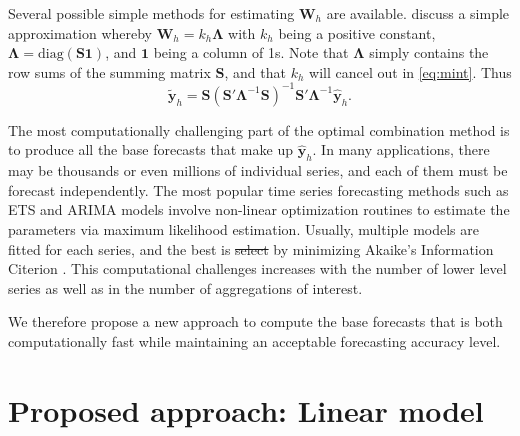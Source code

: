 \documentclass[11pt,a4paper,]{article}
\providecommand{\DIFaddtex}[1]{{\protect\color{blue}\uwave{#1}}} %
\providecommand{\DIFdeltex}[1]{{\protect\color{red}\sout{#1}}}                      %
\providecommand{\DIFaddbegin}{} %
\providecommand{\DIFaddend}{} %
\providecommand{\DIFdelbegin}{} %
\providecommand{\DIFdelend}{} %
\providecommand{\DIFadd}[1]{\texorpdfstring{\DIFaddtex{#1}}{#1}} %
\providecommand{\DIFdel}[1]{\texorpdfstring{\DIFdeltex{#1}}{}} %
\newcommand{\DIFscaledelfig}{0.5}
\newlength{\DIFdelgraphicswidth} %
\newlength{\DIFdelgraphicsheight} %
\newcommand{\DIFaddincludegraphics}[2][]{{\color{blue}\fbox{\DIFOincludegraphics[#1]{#2}}}} %
\newcommand{\DIFdelincludegraphics}[2][]{%
\sbox{\DIFdelgraphicsbox}{\DIFOincludegraphics[#1]{#2}}%
\settoboxwidth{\DIFdelgraphicswidth}{\DIFdelgraphicsbox} %
\settoboxtotalheight{\DIFdelgraphicsheight}{\DIFdelgraphicsbox} %
\scalebox{\DIFscaledelfig}{%
\parbox[b]{\DIFdelgraphicswidth}{\usebox{\DIFdelgraphicsbox}\\[-\baselineskip] \rule{\DIFdelgraphicswidth}{0em}}\llap{\resizebox{\DIFdelgraphicswidth}{\DIFdelgraphicsheight}{%
\setlength{\unitlength}{\DIFdelgraphicswidth}%
\begin{picture}(1,1)%
\thicklines\linethickness{2pt} %
{\color[rgb]{1,0,0}\put(0,0){\framebox(1,1){}}}%
{\color[rgb]{1,0,0}\put(0,0){\line( 1,1){1}}}%
{\color[rgb]{1,0,0}\put(0,1){\line(1,-1){1}}}%
\end{picture}%
}\hspace*{3pt}}} %
} %
\DeclareRobustCommand{\DIFaddbegin}{\DIFOaddbegin \let\includegraphics\DIFaddincludegraphics} %
\DeclareRobustCommand{\DIFaddend}{\DIFOaddend \let\includegraphics\DIFOincludegraphics} %
\DeclareRobustCommand{\DIFdelbegin}{\DIFOdelbegin \let\includegraphics\DIFdelincludegraphics} %
\DeclareRobustCommand{\DIFdelend}{\DIFOaddend \let\includegraphics\DIFOincludegraphics} %
\begin{document}
Several possible simple methods for estimating \(\bm{W}_h\) are available. \textcite{mint2018} discuss a simple approximation whereby \(\bm{W}_h = k_h \bm{\Lambda}\) with \(k_h\) being a positive constant, \(\bm{\Lambda} = \text{diag}(\bm{S}\bm{1})\), and \(\bm{1}\) being a column of 1s. Note that \(\bm{\Lambda}\) simply contains the row sums of the summing matrix \(\bm{S}\), and that \(k_h\) will cancel out in \eqref{eq:mint}. Thus
\begin{equation}\label{eq:mint2}
  \tilde{\bm{y}}_{h}=\bm{S}(\bm{S}'\bm{\Lambda}^{-1}\bm{S})^{-1}\bm{S}'\bm{\Lambda}^{-1}\hat{\bm{y}}_h.
\end{equation}

The most computationally challenging part of the optimal combination method is to produce all the base forecasts that make up \(\hat{\bm{y}}_h\). In many applications, there may be thousands or even millions of individual series, and each of them must be forecast independently. The most popular time series forecasting methods such as ETS and ARIMA models \autocite{fpp2} involve non-linear optimization routines to estimate the parameters via maximum likelihood estimation. Usually, multiple models are fitted for each series, and the best is \DIFdelbegin \DIFdel{select }\DIFdelend \DIFaddbegin \DIFadd{selected }\DIFaddend by minimizing Akaike's Information Citerion \autocite{akaike1998information}. This computational challenges increases with the number of lower level series as well as in the number of aggregations of interest.

We therefore propose a new approach to compute the base forecasts that is both computationally fast while maintaining an acceptable forecasting accuracy level.

\hypertarget{proposed-approach-linear-model}{%
\section{\texorpdfstring{Proposed approach: Linear model \label{sec:proposedapproach1}}{Proposed approach: Linear model }}\label{proposed-approach-linear-model}}
\end{document}
